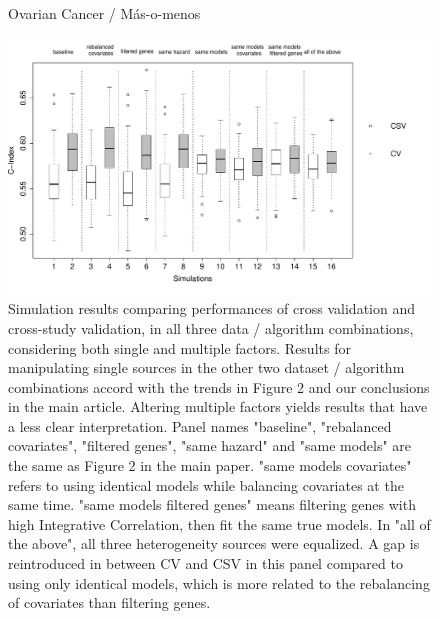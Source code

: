 \documentclass{article}
\begin{document}
   \begin{figure}[H]
   		\centering            
      		\centerline{Ovarian Cancer / M\'{a}s-o-menos}
            \includegraphics[width=16cm]{boxplot_ovarian_masomenos_allpanels.pdf}
         \caption{Simulation results comparing performances of cross validation and cross-study validation, in all three data / algorithm combinations, considering both single and multiple factors. Results for manipulating single sources in the other two dataset / algorithm combinations accord with the trends in Figure 2 and our conclusions in the main article. Altering multiple factors yields results that have a less clear interpretation. Panel names "baseline", "rebalanced covariates", "filtered genes", "same hazard" and "same models" are the same as Figure 2 in the main paper. "same models covariates" refers to using identical models while balancing covariates at the same time. "same models filtered genes" means filtering genes with high Integrative Correlation, then fit the same true models. In "all of the above", all three heterogeneity sources were equalized. A gap is reintroduced in between CV and CSV in this panel compared to using only identical models, which is more related to the rebalancing of covariates than filtering genes.}
         \label{boxplots}
    \end{figure}         


\newpage
\end{document}
